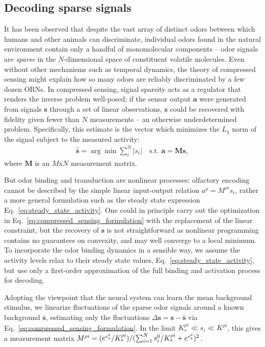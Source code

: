 
\subsection*{Decoding sparse signals}
It has been observed that despite the vast array of distinct odors between which humans and other animals can discriminate, individual odors found in the natural environment contain only a handful of monomolecular components -- odor signals are \textit{sparse} in the $N$-dimensional space of constituent volatile molecules. Even without other mechanisms such as temporal dynamics, the theory of compressed sensing might explain how so many odors are reliably discriminated by a few dozen ORNs. In compressed sensing, signal sparsity acts as a regulator that renders the inverse problem well-posed; if the sensor output $\mathbf a$ were generated from signals $\mathbf s$ through a set of linear observations, $\mathbf s$ could be recovered with fidelity given fewer than $N$ measurements -- an otherwise underdetermined problem. %
Specifically, this estimate is the vector which minimizes the $L_1$ norm of the signal subject to the measured activity:
\begin{align}
\hat {\mathbf s} = \arg \min \sum_i^N |s_i| \quad \text {s.t.  } \mathbf a = \mathbf M \mathbf s,
\label{eq:compressed_sensing_formulation}
\end{align}
where $\mathbf M$ is an $M$x$N$ measurement matrix.

But odor binding and transduction are nonlinear processes: olfactory encoding cannot be described by the simple linear input-output relation $a^\rho = M^{\rho i} s_i$, rather a more general formulation such as the steady state expression Eq.~\ref{eq:steady_state_activity}. One could in principle carry out the optimization in Eq.~\ref{eq:compressed_sensing_formulation} with the replacement of the linear constraint,  but the recovery of $\mathbf s$ is not straightforward as nonlinear programming contains no guarantees on convexity, and may well converge to a local minimum. To incorporate the odor binding dynamics in a sensible way, we assume the activity levels relax to their steady state values, Eq.~\ref{eq:steady_state_activity}, but use only a first-order approximation of the full binding and activation process for decoding. 

Adopting the viewpoint that the neural system can learn the mean background stimulus, we linearize fluctuations of the sparse odor signals around a known background $\bar{\mathbf s}$, estimating only the fluctuations $\Delta \mathbf s = \mathbf s - \bar{\mathbf s}$ via Eq.~\ref{eq:compressed_sensing_formulation}. In the limit $K_*^{\rho i} \ll s_i \ll K^{\rho i}$, this gives a measurement matrix $M^{\rho i} = (e^{\epsilon^\rho_{\text u}}/K_*^{\rho i})/(\sum_{i=1}^N s_i^0/K_*^{\rho i} + e^{\epsilon^\rho_{\text u}})^2$. 